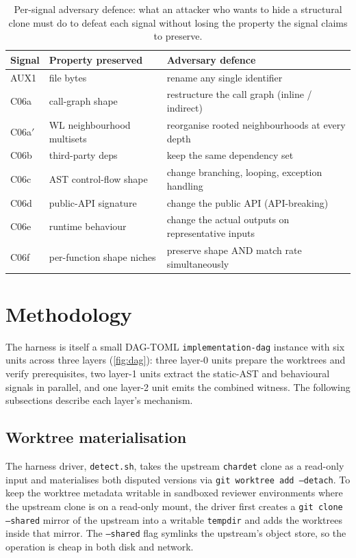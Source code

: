 \documentclass[11pt,letterpaper]{article}
\begin{document}
\begin{table}[h]
\small
\centering
\caption{Per-signal adversary defence: what an attacker who wants to
hide a structural clone must do to defeat each signal without
losing the property the signal claims to preserve.}
\label{tab:adversary}
\begin{tabular}{lll}
\toprule
Signal & Property preserved & Adversary defence \\
\midrule
AUX1 & file bytes & rename any single identifier \\
C06a & call-graph shape & restructure the call graph (inline / indirect) \\
C06a$'$ & WL neighbourhood multisets & reorganise rooted neighbourhoods at every depth \\
C06b & third-party deps & keep the same dependency set \\
C06c & AST control-flow shape & change branching, looping, exception handling \\
C06d & public-API signature & change the public API (API-breaking) \\
C06e & runtime behaviour & change the actual outputs on representative inputs \\
C06f & per-function shape niches & preserve shape AND match rate simultaneously \\
\bottomrule
\end{tabular}
\end{table}

\section{Methodology}
\label{sec:methodology}

The harness is itself a small DAG-TOML \texttt{implementation-dag}
instance with six units across three layers (\cref{fig:dag}): three
layer-0 units prepare the worktrees and verify prerequisites, two
layer-1 units extract the static-AST and behavioural signals in
parallel, and one layer-2 unit emits the combined witness. The
following subsections describe each layer's mechanism.

\subsection{Worktree materialisation}
\label{sec:worktree}
The harness driver, \texttt{detect.sh}, takes the upstream
\texttt{chardet} clone as a read-only input and materialises both
disputed versions via \texttt{git worktree add --detach}. To keep the
worktree metadata writable in sandboxed reviewer environments where
the upstream clone is on a read-only mount, the driver first creates
a \texttt{git clone --shared} mirror of the upstream into a writable
\texttt{tempdir} and adds the worktrees inside that mirror. The
\texttt{--shared} flag symlinks the upstream's object store, so the
operation is cheap in both disk and network.
\end{document}

